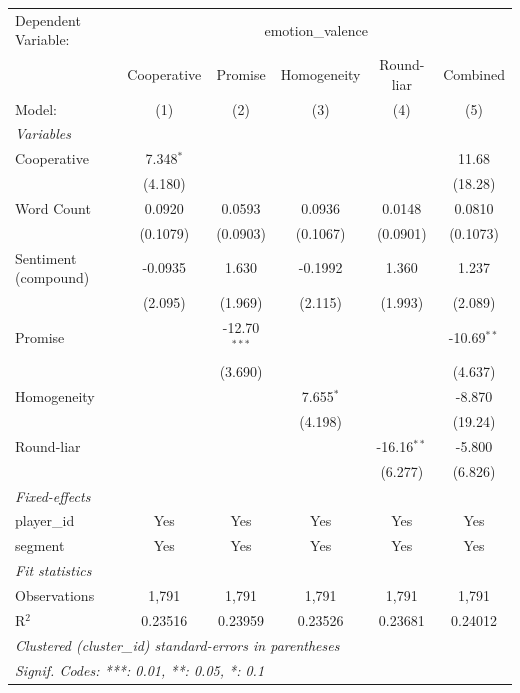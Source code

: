 
\begingroup
\centering
\begin{tabular}{lccccc}
   \tabularnewline \midrule \midrule
   Dependent Variable: & \multicolumn{5}{c}{emotion\_valence}\\
                        & Cooperative & Promise        & Homogeneity & Round-liar    & Combined \\   
   Model:               & (1)         & (2)            & (3)         & (4)           & (5)\\  
   \midrule
   \emph{Variables}\\
   Cooperative          & 7.348$^{*}$ &                &             &               & 11.68\\   
                        & (4.180)     &                &             &               & (18.28)\\   
   Word Count           & 0.0920      & 0.0593         & 0.0936      & 0.0148        & 0.0810\\   
                        & (0.1079)    & (0.0903)       & (0.1067)    & (0.0901)      & (0.1073)\\   
   Sentiment (compound) & -0.0935     & 1.630          & -0.1992     & 1.360         & 1.237\\   
                        & (2.095)     & (1.969)        & (2.115)     & (1.993)       & (2.089)\\   
   Promise              &             & -12.70$^{***}$ &             &               & -10.69$^{**}$\\   
                        &             & (3.690)        &             &               & (4.637)\\   
   Homogeneity          &             &                & 7.655$^{*}$ &               & -8.870\\   
                        &             &                & (4.198)     &               & (19.24)\\   
   Round-liar           &             &                &             & -16.16$^{**}$ & -5.800\\   
                        &             &                &             & (6.277)       & (6.826)\\   
   \midrule
   \emph{Fixed-effects}\\
   player\_id           & Yes         & Yes            & Yes         & Yes           & Yes\\  
   segment              & Yes         & Yes            & Yes         & Yes           & Yes\\  
   \midrule
   \emph{Fit statistics}\\
   Observations         & 1,791       & 1,791          & 1,791       & 1,791         & 1,791\\  
   R$^2$                & 0.23516     & 0.23959        & 0.23526     & 0.23681       & 0.24012\\  
   \midrule \midrule
   \multicolumn{6}{l}{\emph{Clustered (cluster\_id) standard-errors in parentheses}}\\
   \multicolumn{6}{l}{\emph{Signif. Codes: ***: 0.01, **: 0.05, *: 0.1}}\\
\end{tabular}
\par\endgroup


